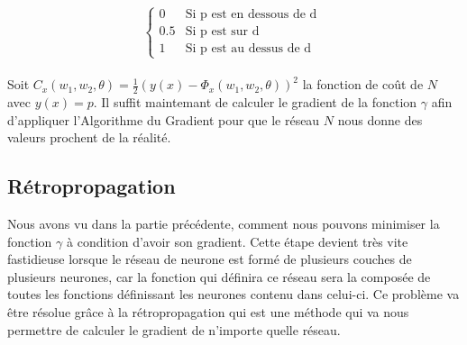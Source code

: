 \documentclass{article}
\begin{document}
	\[ \begin{cases} 0 &\mbox{Si  p est en dessous de d } \\
				 0.5 & \mbox{Si p est sur d } \\
				 1 & \mbox{Si p est au dessus de d }
	 		 \end{cases} \] \\
Soit $ C_x(w_{1},w_{2},\theta) = \frac{1}{2}(y(x)-\Phi_x(w_{1},w_{2},\theta))^{2} $ la fonction de coût de $N$ avec $y(x)=p$.
Il suffit maintemant de calculer le gradient de la fonction $\gamma$ afin d'appliquer l'Algorithme du Gradient pour que le réseau $N$ nous donne des valeurs prochent de la réalité.\\
\newline

\subsection{Rétropropagation}
Nous avons vu dans la partie précédente, comment nous pouvons minimiser la fonction $\gamma$ à condition d'avoir son gradient. Cette étape
devient très vite fastidieuse lorsque le réseau de neurone est formé de plusieurs couches de plusieurs neurones, car la fonction qui
définira ce réseau sera la composée de toutes les fonctions définissant les neurones contenu dans celui-ci. Ce problème va être résolue 
grâce à la rétropropagation qui est une méthode qui va nous permettre de calculer le gradient de n'importe quelle réseau.
\end{document}
